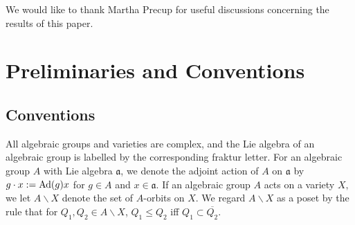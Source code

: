 \documentclass[12pt]{amsart}
\numberwithin{equation}{section}
\newcommand{\fa}{\mbox{${\mathfrak a}$}}
\newcommand{\Ad}{{\rm Ad}}
\newcommand{\B}{\mathcal{B}}
\begin{document}



 We would like to thank Martha Precup for useful discussions concerning the results of this paper.


\section{Preliminaries and Conventions}\label{s:prelim}
\subsection{Conventions}\label{ss:conven}
 All algebraic groups and varieties are complex, and the Lie algebra of an algebraic group is labelled by the corresponding fraktur letter.  For an algebraic group $A$ with Lie algebra $\fa$, we denote the adjoint action of $A$ on $\fa$ by $g\cdot x:=\Ad(g)x$ for $g\in A$ and $x\in\fa$.   If an algebraic group $A$ acts on a variety $X,$ we let $A\backslash X$ denote the set of $A$-orbits on $X.$ We regard $A\backslash X$ as a poset by the rule that for $Q_1, Q_2 \in A\backslash X$, $Q_1 \le Q_2$ iff $Q_1 \subset \overline{Q_2}.$  
 
\end{document}
